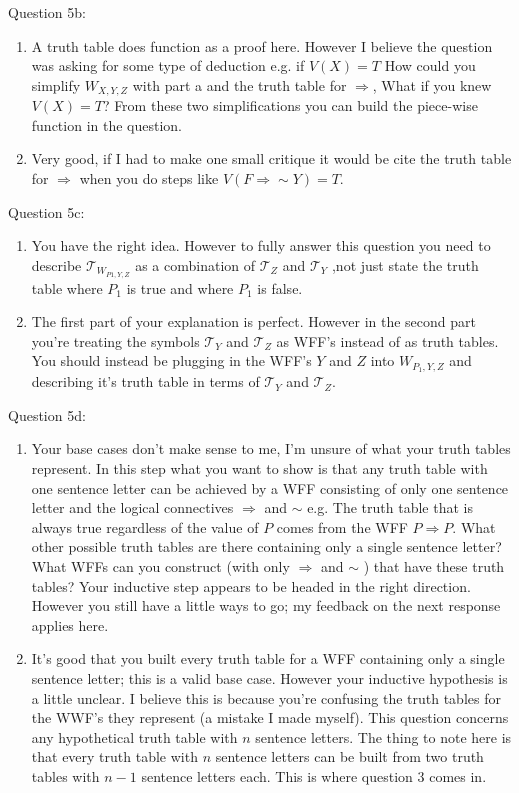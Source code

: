 \documentclass[11pt] {article}
\newcommand{\T}{\mathcal{T}}
\begin{document}
Question 5b:
\begin{enumerate}
\item A truth table does function as a proof here. However I believe the question was asking for some type of deduction e.g. if $V(X) = T$ How could you simplify $W_{X,Y,Z}$  with part a and the truth table for $\Rightarrow$, What if you knew $V(X) = T$? From these two simplifications you can build the piece-wise function in the question.
\item Very good, if I had to make one small critique it would be cite the truth table for $\Rightarrow$ when you do steps like $V(F \Rightarrow \sim Y) = T$.
\end{enumerate}
Question 5c:
\begin{enumerate}
\item You have the right idea. However to fully answer this question you need to describe $\T_{W_{P1, Y, Z}}$ as a combination of $\T_Z$ and $\T_Y$ ,not just state the truth table where $P_1$ is true and where $P_1$ is false.
\item The first part of your explanation is perfect. However in the second part you're treating the symbols $\T_Y$ and $\T_Z$ as WFF's instead of as truth tables. You should instead be plugging in the WFF's $Y$ and $Z$ into $W_{P_1,Y,Z}$ and  describing it's truth table in terms of $\T_Y$ and $\T_Z$. 
\end{enumerate}
Question 5d:
\begin{enumerate}
\item Your base cases don't make sense to me, I'm unsure of what your truth tables represent. In this step what you want to show is that any truth table with one sentence letter can be achieved by a WFF consisting of only one sentence letter and the logical connectives $\Rightarrow$ and
$\sim$ e.g. The truth table that is always true regardless of the value of $P$ comes from the WFF $P \Rightarrow P$. What other possible truth tables are there containing only a single sentence letter? What WFFs can you construct (with only $\Rightarrow$ and $\sim$ ) that have these truth tables? Your inductive step appears to be headed in the right direction. However you still have a little ways to go; my feedback on the next response applies here.
\item It's good that you built every truth table for a WFF containing only a single sentence letter; this is a valid base case. However your inductive hypothesis is a little unclear. I believe this is because you're confusing the truth tables for the WWF's they represent (a mistake I made myself). This question concerns any hypothetical truth table with $n$ sentence letters. The thing to note here is that every truth table with $n$ sentence letters can be built from two truth tables with $n-1$ sentence letters each.  This is where question 3 comes in. 
\end{enumerate}
\end{document}
